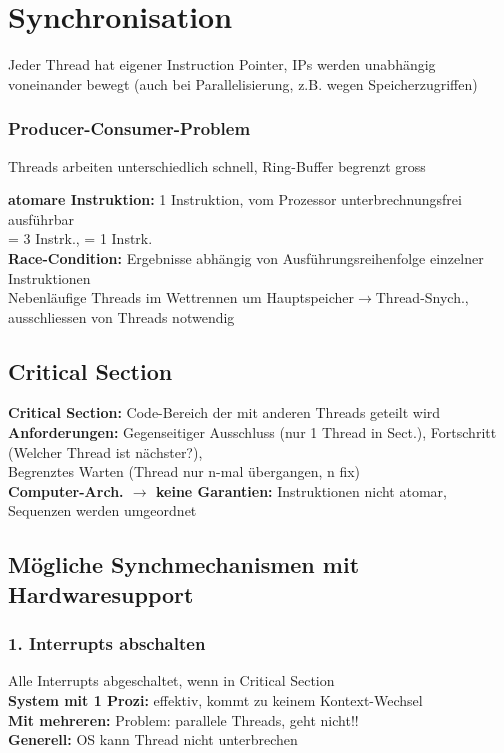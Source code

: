 \section{Synchronisation}
Jeder Thread hat eigener Instruction Pointer, IPs werden unabhängig voneinander bewegt (auch bei Parallelisierung, z.B. wegen Speicherzugriffen)
\subsubsection{Producer-Consumer-Problem}
Threads arbeiten unterschiedlich schnell, Ring-Buffer begrenzt gross

\textbf{atomare Instruktion: }1 Instruktion, vom Prozessor unterbrechnungsfrei ausführbar\\
 = 3 Instrk.,  = 1 Instrk.\\
\textbf{Race-Condition: }Ergebnisse abhängig von Ausführungsreihenfolge einzelner Instruktionen\\
Nebenläufige Threads im Wettrennen um Hauptspeicher$\rightarrow$Thread-Snych., ausschliessen von Threads notwendig

\subsection{Critical Section}
\textbf{Critical Section: }Code-Bereich der mit anderen Threads geteilt wird\\
\textbf{Anforderungen:} Gegenseitiger Ausschluss (nur 1 Thread in Sect.), 
Fortschritt (Welcher Thread ist nächster?),\\ 
Begrenztes Warten (Thread nur n-mal übergangen, n fix)\\
\textbf{Computer-Arch. $\rightarrow$ keine Garantien:} Instruktionen nicht atomar, Sequenzen werden umgeordnet

\subsection{Mögliche Synchmechanismen mit Hardwaresupport}
\subsubsection{1. Interrupts abschalten}
Alle Interrupts abgeschaltet, wenn in Critical Section\\
\textbf{System mit 1 Prozi:} effektiv, kommt zu keinem Kontext-Wechsel\\
\textbf{Mit mehreren:} Problem: parallele Threads, geht nicht!!\\
\textbf{Generell: } OS kann Thread nicht unterbrechen 

